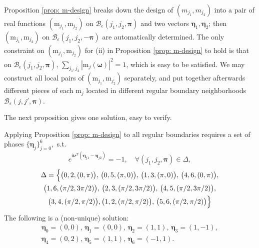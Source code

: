 

Proposition \ref{prop: m-design} breaks down the design of $(m_{j_1},m_{j_2})$ into a pair of real functions $(\mathrm{m}_{j_1}, \mathrm{m}_{j_2})$ on $\mathcal{B}_{\epsilon}(j_1,j_2,\boldsymbol{\pi})$ and two vectors $\boldsymbol{\eta}_1,\boldsymbol{\eta}_2$; then $(\mathrm{m}_{j_1}, \mathrm{m}_{j_2})$ on $\mathcal{B}_{\epsilon}(j_1,j_2,-\boldsymbol{\pi})$ are automatically determined. %
The only constraint on $(\mathrm{m}_{j_1},\mathrm{m}_{j_2})$ for (ii) in Proposition \ref{prop: m-design} to hold is that on $\mathcal{B}_{\epsilon}(j_1,j_2,\boldsymbol{\pi})$, $\sum_{j_1,j_2}|\mathrm{m}_{j}(\boldsymbol{\omega})|^2= 1$, which is easy to be satisfied.
We may construct all local pairs of $(\mathrm{m}_{j_1},\mathrm{m}_{j_2})$ separately, and put together afterwards different pieces of each $\mathrm{m}_j$ located in different regular boundary neighborhoods $\mathcal{B}_{\epsilon}(j,j',\boldsymbol{\pi})$. 

\vspace*{.2em}
The next proposition gives %
one solution, easy to verify.
\begin{prop}\label{prop: phase}
Applying Proposition \ref{prop: m-design} to all regular boundaries requires a set of phases $\{\boldsymbol{\eta}_j\}_{j = 0}^6,$ s.t.\[\textstyle e^{i\boldsymbol{\nu}^T(\boldsymbol{\eta}_{j1}-\boldsymbol{\eta}_{j2})} = -1, \quad\forall (j_1,j_2,\boldsymbol{\pi})\in\Delta,\]
{\small\begin{multline*}
\Delta = \Bigl\{\big(0,2,(0,\pi)\big),\, \big(0,5,(\pi,0)\big),\,\big(1,3,(\pi,0)\big),\,\big(4,6,(0,\pi)\big),\\
\big(1,6,(\pi/2, 3\pi/2)\big),\,\big(2,3,(\pi/2, 3\pi/2)\big),\,\big(4,5,(\pi/2, 3\pi/2)\big), \\
\big(3,4,(\pi/2, \pi/2)\big),\big(1,2,(\pi/2, \pi/2)\big),\,\big(5,6,(\pi/2, \pi/2)\big)\Bigr\}
\end{multline*}}
The following is a (non-unique) solution: 
{\small\begin{multline*}\boldsymbol{\eta}_0 = (0,0),\,\boldsymbol{\eta}_1 = (0,0),\,\boldsymbol{\eta}_2 = (1,1),\,\boldsymbol{\eta}_3 = (1,-1),\\
\boldsymbol{\eta}_4 = (0,2),\,\boldsymbol{\eta}_5=(1,1),\,\boldsymbol{\eta}_6 = (-1,1).
\end{multline*}}
\end{prop}

